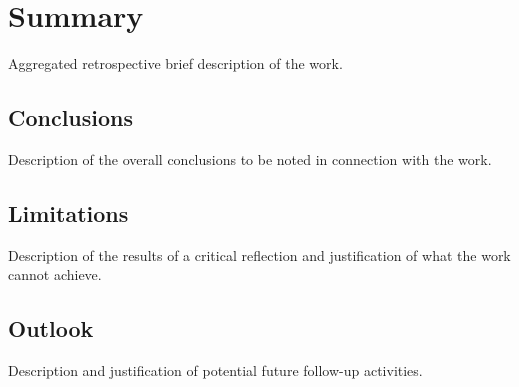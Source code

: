 \chapter{Summary}
\label{ch:summary}

Aggregated retrospective brief description of the work.

\section{Conclusions}
Description of the overall conclusions to be noted in connection with the work.

\section{Limitations}
Description of the results of a critical reflection and justification of what
the work cannot achieve.

\section{Outlook}
Description and justification of potential future follow-up activities.
